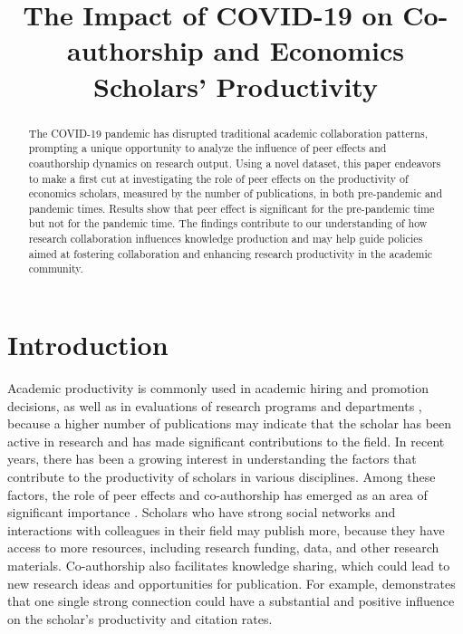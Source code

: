 
\title{The Impact of COVID-19 on Co-authorship and Economics Scholars' Productivity
}
\maketitle

\begin{abstract}
The COVID-19 pandemic has disrupted traditional academic collaboration patterns, prompting a unique opportunity to analyze the influence of peer effects and coauthorship dynamics on research output. Using a novel dataset, this paper endeavors to make a first cut at investigating the role of peer effects on the productivity of economics scholars, measured by the number of publications, in both pre-pandemic and pandemic times. Results show that peer effect is significant for the pre-pandemic time but not for the pandemic time. The findings contribute to our understanding of how research collaboration influences knowledge production and may help guide policies aimed at fostering collaboration and enhancing research productivity in the academic community.
\end{abstract}


\section{Introduction}

Academic productivity is commonly used in academic hiring and promotion decisions, as well as in evaluations of research programs and departments \cite{gingras2016bibliometrics, bornmann2008citation}, because a higher number of publications may indicate that the scholar has been active in research and has made significant contributions to the field. In recent years, there has been a growing interest in understanding the factors that contribute to the productivity of scholars in various disciplines. Among these factors, the role of peer effects and co-authorship has emerged as an area of significant importance \cite{ductor2014social}. Scholars who have strong social networks and interactions with colleagues in their field may publish more, because they have access to more resources, including research funding, data, and other research materials. Co-authorship also facilitates knowledge sharing, which could lead to new research ideas and opportunities for publication. For example, \cite{petersen2015quantifying} demonstrates that one single strong connection could have a substantial and positive influence on the scholar's productivity and citation rates.

